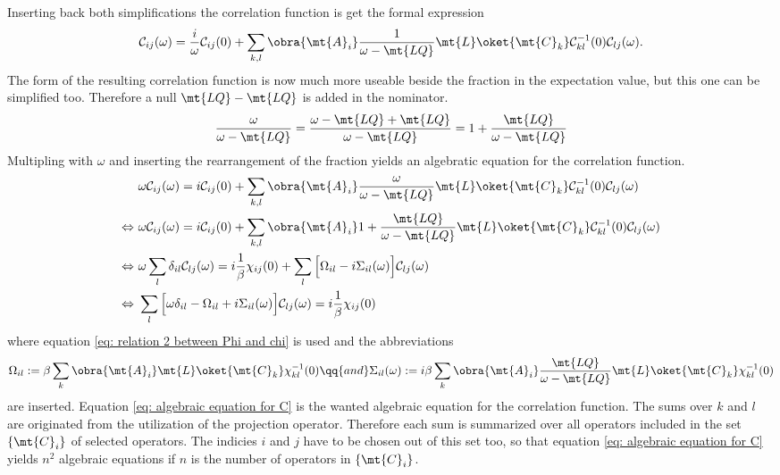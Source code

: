 %
Inserting back both simplifications the correlation function is get the formal expression
%
\begin{align}
	\mathcal{C}_{ij}(\omega) = \frac{i}{\omega} \mathcal{C}_{ij}(0) + \sum\limits_{k,l} \obra{\mt{A}_{i}} \frac{1}{\omega - \mt{LQ}} \mt{L} \oket{\mt{C}_{k}} \mathcal{C}_{kl}^{-1}(0) \mathcal{C}_{lj}(\omega).
\end{align}
%
The form of the resulting correlation function is now much more useable beside the fraction in the expectation value, but this one can be simplified too.
Therefore a null $\mt{LQ} - \mt{LQ}$ is added in the nominator.
%
\begin{align}
	\frac{\omega}{\omega - \mt{LQ}} = \frac{\omega - \mt{LQ} + \mt{LQ}}{\omega - \mt{LQ}} = 1 + \frac{\mt{LQ}}{\omega - \mt{LQ}}
\end{align}
%
Multipling with $\omega$ and inserting the rearrangement of the fraction yields an algebratic equation for the correlation function.
%
\begin{align}
	&\omega \mathcal{C}_{ij}(\omega) = i \mathcal{C}_{ij}(0) + \sum\limits_{k,l} \obra{\mt{A}_{i}} \frac{\omega}{\omega - \mt{LQ}} \mt{L} \oket{\mt{C}_{k}} \mathcal{C}_{kl}^{-1}(0) \mathcal{C}_{lj}(\omega)
	\notag \\
	\Leftrightarrow\ &\omega \mathcal{C}_{ij}(\omega) = i \mathcal{C}_{ij}(0) + \sum\limits_{k,l} \obra{\mt{A}_{i}} 1 + \frac{\mt{LQ}}{\omega - \mt{LQ}} \mt{L} \oket{\mt{C}_{k}} \mathcal{C}_{kl}^{-1}(0) \mathcal{C}_{lj}(\omega)
	\notag \\
	\Leftrightarrow\ &\omega \sum\limits_{l} \delta_{il} \mathcal{C}_{lj}(\omega) = i \frac{1}{\beta} \chi_{ij}(0) + \sum\limits_{l} \Big[\Omega_{il} -i \Sigma_{il}(\omega)\Big]  \mathcal{C}_{lj}(\omega)
	\notag \\
	\Leftrightarrow\ &\sum\limits_{l} \Big[\omega \delta_{il} - \Omega_{il} + i \Sigma_{il}(\omega)\Big] \mathcal{C}_{lj}(\omega) = i \frac{1}{\beta} \chi_{ij}(0)
	\label{eq: algebraic equation for C}
\end{align}
%
where equation \eqref{eq: relation 2 between Phi and chi} is used and the abbreviations
%
\begin{align}
	\Omega_{il} := \beta \sum\limits_{k} \obra{\mt{A}_{i}} \mt{L} \oket{\mt{C}_{k}} \chi_{kl}^{-1}(0)
	\qq{and}
	\Sigma_{il}(\omega) := i \beta \sum\limits_{k} \obra{\mt{A}_{i}} \frac{\mt{LQ}}{\omega - \mt{LQ}} \mt{L} \oket{\mt{C}_{k}} \chi_{kl}^{-1}(0)
\end{align}
%
are inserted.
Equation \eqref{eq: algebraic equation for C} is the wanted algebraic equation for the correlation function.
The sums over $k$ and $l$ are originated from the utilization of the projection operator.
Therefore each sum is summarized over all operators included in the set $\{\mt{C}_{i}\}$ of selected operators.
The indicies $i$ and $j$ have to be chosen out of this set too, so that equation \eqref{eq: algebraic equation for C} yields $n^{2}$ algebraic equations if $n$ is the number of operators in $\{\mt{C}_{i}\}$.

